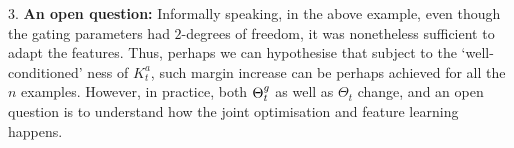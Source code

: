 $3.$ \textbf{An open question:} Informally speaking, in the above example, even though the gating parameters had $2$-degrees of freedom, it was nonetheless sufficient to adapt the features. Thus, perhaps we can hypothesise that subject to the `well-conditioned' ness of $K^a_t$, such margin increase can be perhaps achieved for all the $n$ examples.  However, in practice, both ${\Theta}^g_t$ as well as $\Theta_t$ change, and an open question is to understand how the joint optimisation and feature learning happens. 